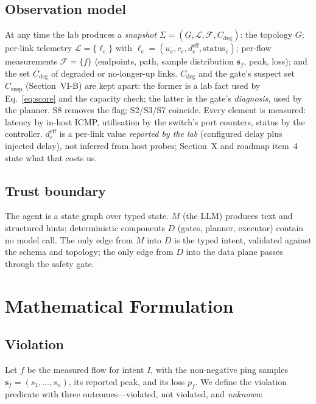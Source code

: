 \documentclass[conference]{IEEEtran}
\begin{document}
\subsection{Observation model}
At any time the lab produces a \emph{snapshot}
$\Sigma=(G,\mathcal{L},\mathcal{F},C_{\mathrm{deg}})$: the topology $G$;
per-link telemetry $\mathcal{L}=\{\ell_e\}$ with
$\ell_e=(u_e,c_e,d^{\mathrm{eff}}_e,\mathrm{status}_e)$; per-flow
measurements $\mathcal{F}=\{f\}$ (endpoints, path, sample distribution
$\mathbf{s}_f$, peak, loss); and the set $C_{\mathrm{deg}}$ of degraded or
no-longer-up links. $C_{\mathrm{deg}}$ and the gate's suspect set
$C_{\mathrm{susp}}$ (Section~VI-B) are kept apart: the former is a lab fact
used by Eq.~\eqref{eq:score} and the capacity check; the latter is the
gate's \emph{diagnosis}, used by the planner. S8 removes the flag; S2/S3/S7
coincide. Every element is measured: latency by in-host ICMP, utilisation by
the switch's port counters, status by the controller. $d^{\mathrm{eff}}_e$
is a per-link value \emph{reported by the lab} (configured delay plus
injected delay), not inferred from host probes; Section~X and roadmap
item~4 state what that costs us.

\subsection{Trust boundary}
The agent is a state graph over typed state. $M$ (the LLM) produces text and
structured hints; deterministic components $D$ (gates, planner, executor)
contain no model call. The only edge from $M$ into $D$ is the typed intent,
validated against the schema and topology; the only edge from $D$ into the
data plane passes through the safety gate.

\section{Mathematical Formulation}

\subsection{Violation}

Let $f$ be the measured flow for intent $I$, with the non-negative ping
samples $\mathbf{s}_f=(s_1,\dots,s_n)$, its reported peak, and its loss
$p_f$. We define the violation predicate with three outcomes---violated,
not violated, and \emph{unknown}:
\end{document}

